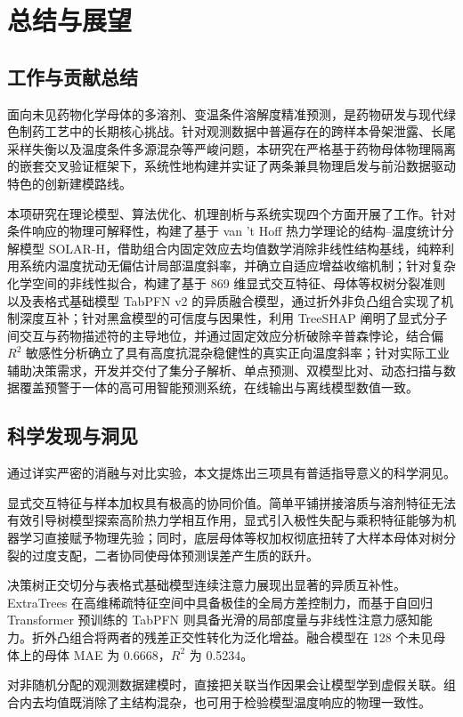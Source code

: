 \section{总结与展望}

\subsection{工作与贡献总结}

面向未见药物化学母体的多溶剂、变温条件溶解度精准预测，是药物研发与现代绿色制药工艺中的长期核心挑战。针对观测数据中普遍存在的跨样本骨架泄露、长尾采样失衡以及温度条件多源混杂等严峻问题，本研究在严格基于药物母体物理隔离的嵌套交叉验证框架下，系统性地构建并实证了两条兼具物理启发与前沿数据驱动特色的创新建模路线。

本项研究在理论模型、算法优化、机理剖析与系统实现四个方面开展了工作。针对条件响应的物理可解释性，构建了基于 van 't Hoff 热力学理论的结构--温度统计分解模型 SOLAR-H，借助组合内固定效应去均值数学消除非线性结构基线，纯粹利用系统内温度扰动无偏估计局部温度斜率，并确立自适应增益收缩机制；针对复杂化学空间的非线性拟合，构建了基于 869 维显式交互特征、母体等权树分裂准则以及表格式基础模型 TabPFN v2 的异质融合模型，通过折外非负凸组合实现了机制深度互补；针对黑盒模型的可信度与因果性，利用 TreeSHAP 阐明了显式分子间交互与药物描述符的主导地位，并通过固定效应分析破除辛普森悖论，结合偏 $R^2$ 敏感性分析确立了具有高度抗混杂稳健性的真实正向温度斜率；针对实际工业辅助决策需求，开发并交付了集分子解析、单点预测、双模型比对、动态扫描与数据覆盖预警于一体的高可用智能预测系统，在线输出与离线模型数值一致。

\subsection{科学发现与洞见}

通过详实严密的消融与对比实验，本文提炼出三项具有普适指导意义的科学洞见。

显式交互特征与样本加权具有极高的协同价值。简单平铺拼接溶质与溶剂特征无法有效引导树模型探索高阶热力学相互作用，显式引入极性失配与乘积特征能够为机器学习直接赋予物理先验；同时，底层母体等权加权彻底扭转了大样本母体对树分裂的过度支配，二者协同使母体预测误差产生质的跃升。

决策树正交切分与表格式基础模型连续注意力展现出显著的异质互补性。ExtraTrees 在高维稀疏特征空间中具备极佳的全局方差控制力，而基于自回归 Transformer 预训练的 TabPFN 则具备光滑的局部度量与非线性注意力感知能力。折外凸组合将两者的残差正交性转化为泛化增益。融合模型在 128 个未见母体上的母体 MAE 为 0.6668，$R^2$ 为 0.5234。

对非随机分配的观测数据建模时，直接把关联当作因果会让模型学到虚假关联。组合内去均值既消除了主结构混杂，也可用于检验模型温度响应的物理一致性。